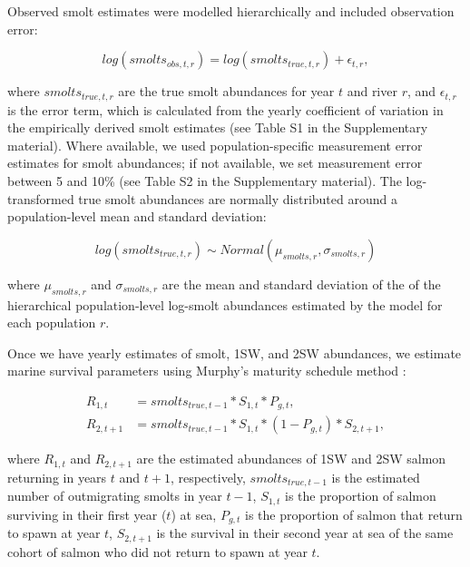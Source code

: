 \documentclass[12pt]{article}
\newcommand{\comment}[1]{\par {\bfseries \color{blue} #1 \par}} %
\begin{document}

Observed smolt estimates were modelled hierarchically and included
observation error:

\begin{equation}
log(smolts_{obs,t,r}) = log(smolts_{true,t,r}) + \epsilon_{t,r},
\end{equation}

where $smolts_{true,t,r}$ are the true smolt abundances for year $t$ and river
$r$, and $\epsilon_{t,r}$ is the error term, which is calculated from the yearly 
coefficient of variation in the empirically derived
smolt estimates (see Table S1 in the Supplementary material). 
Where available, we used population-specific measurement error estimates for smolt abundances; if not 
available, we set measurement error between 5 and 10\% (see Table S2 in the Supplementary material). 
The log-transformed true smolt abundances are
normally distributed around a population-level mean and standard deviation:

\begin{equation}
log(smolts_{true,t,r}) \sim Normal(\mu_{smolts,r}, \sigma_{smolts,r})
\end{equation}

where $\mu_{smolts,r}$ and $\sigma_{smolts,r}$ are the mean and standard
deviation of the of the hierarchical population-level log-smolt abundances
estimated by the model for each population $r$.

Once we have yearly estimates of smolt, 1SW, and 2SW abundances, we estimate
marine survival parameters using Murphy's maturity schedule method
\citep{Murphy1952, Ricker1975}:

\begin{align}
    R_{1,t} &= smolts_{true,t-1} * S_{1,t} * P_{g,t} \label{eq:1}, \\
    R_{2,t+1} &= smolts_{true,t-1} * S_{1,t} * (1 - P_{g,t}) * S_{2,t+1}, \label{eq:2}
\end{align}

where $R_{1,t}$ and $R_{2,t+1}$ are the estimated abundances of 1SW and 2SW
salmon returning in years $t$ and $t+1$, respectively, $smolts_{true,t-1}$ is the
estimated number of outmigrating smolts in year $t-1$, $S_{1,t}$ is the proportion of
salmon surviving in their first year ($t$) at sea, $P_{g,t}$ is the proportion of
salmon that return to spawn at year $t$, $S_{2,t+1}$ is the survival in their
second year at sea of the same cohort of salmon who did not return to spawn at
year $t$.
\end{document}
